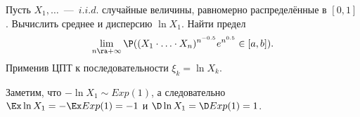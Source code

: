 \begin{problem}
    Пусть $X_1, \ldots$~---~$i.i.d.$ случайные величины, равномерно распределённые в $[0, 1]$.
    Вычислить среднее и дисперсию $\ln X_1$.
    Найти предел
    \[
    \lim\limits_{n \ra +\infty} \P((X_1 \cdot \ldots \cdot X_n)^{n^{-0.5}}e^{n^{0.5}} \in [a, b]).
    \]
    Применив ЦПТ к последовательности $\xi_k = \ln X_k$.
\end{problem}
\begin{solution}
   Заметим, что $-\ln X_1 \sim Exp(1)$, а следовательно $\Ex \ln X_1 = - \Ex Exp(1) = -1$ и $\D \ln X_1 = \D Exp(1) = 1$.
\end{solution}
